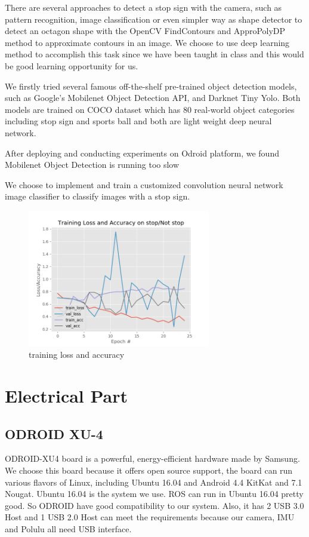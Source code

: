 \documentclass[a4paper, 10pt, conference]{ieeeconf}      %
\begin{document}
There are several approaches to detect a stop sign with the camera, such as pattern recognition, image classification or even simpler way as shape detector to detect an octagon shape with the OpenCV FindContours and ApproPolyDP method to approximate contours in an image. We choose to use deep learning method to accomplish this task since we have been taught in class and this would be good learning opportunity for us. 

We firstly tried several famous off-the-shelf pre-trained object detection models, such as Google's Mobilenet Object Detection API, and Darknet Tiny Yolo. Both models are trained on COCO dataset which has 80 real-world object categories including stop sign and sports ball and both are light weight deep neural network. 

After deploying and conducting experiments on Odroid platform, we found Mobilenet Object Detection is running too slow 

We choose to implement and train a customized convolution neural network image classifier to classify images with a stop sign.

\begin{figure}
    \centering
    \includegraphics[width=8cm]{model_training.png}
    \caption{training loss and accuracy}
    \label{fig:model_training}
\end{figure}



\section{Electrical Part}

\subsection{ODROID XU-4}
ODROID-XU4 board is a powerful, energy-efficient hardware made by Samsung. We choose this board because it offers open source support, the board can run various flavors of Linux, including Ubuntu 16.04 and Android 4.4 KitKat and 7.1 Nougat. Ubuntu 16.04 is the system we use. ROS can run in Ubuntu 16.04 pretty good. So ODROID have good compatibility to our system. Also, it has 2 USB 3.0 Host and 1 USB 2.0 Host can meet the requirements because our camera, IMU and Polulu all need USB interface. 
\end{document}
